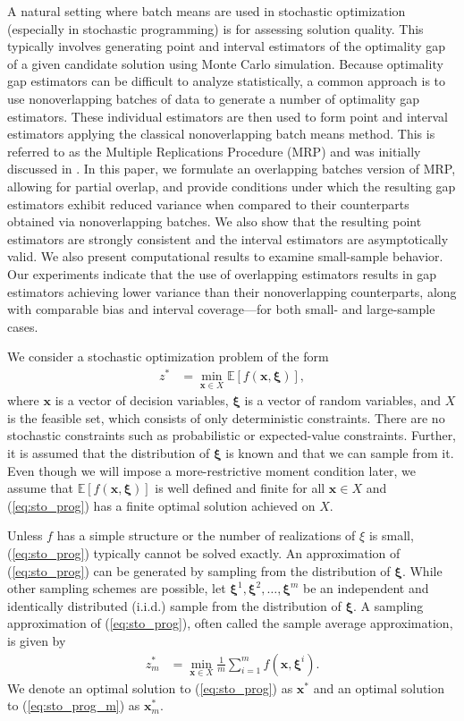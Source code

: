 \documentclass[12pt]{article}
\newcommand{\e}[1]{\mathbb{E} \left[ #1 \right]
}
\newcommand{\x}{\mathbf{x}}
\newcommand{\xs}{\x^*}
\newcommand{\xit}{\boldsymbol{\xi}}
\newcommand{\xiti}{\xit^i}
\begin{document}
A natural setting where batch means are used in stochastic optimization (especially in stochastic programming) is for assessing solution quality. 
This typically involves generating point and interval estimators of the optimality gap of a given candidate solution using Monte Carlo simulation. 
Because optimality gap estimators can be difficult to analyze statistically, a common approach is to use nonoverlapping batches of data to generate a number of optimality gap estimators. 
These individual estimators are then used to form point and interval estimators applying the classical nonoverlapping batch means method.
This is referred to as the Multiple Replications Procedure (MRP) and was initially discussed in \citep{Mak1999}.   
In this paper, we formulate an overlapping batches version of MRP, allowing for partial overlap, and provide conditions under which the resulting gap estimators exhibit reduced variance when compared to their counterparts obtained via nonoverlapping batches.
We also show that the resulting point estimators are strongly consistent and the interval estimators are asymptotically valid. 
We also present computational results to examine small-sample behavior. 
Our experiments indicate that the use of overlapping estimators results in gap estimators achieving lower variance than their nonoverlapping counterparts, along with comparable bias and interval coverage---for both small- and large-sample cases.


We consider a stochastic optimization problem of the form 
\begin{align} \tag{SP} \label{eq:sto_prog} 
	z^* & = \min_{\x \in X} \e{f(\x,\xit)},
\end{align}
where $\x$ is a vector of decision variables, $\xit$ is a vector of random variables, and $X$ is the feasible set, which consists of only deterministic constraints. 
There are no stochastic constraints such as probabilistic or expected-value constraints. 
Further, it is assumed that the distribution of $\xit$ is known and that we can sample from it.
Even though we will impose a more-restrictive moment condition later, we assume that $\e{f(\x,\xit)}$ is well defined and finite for all $\x \in X$ and (\ref{eq:sto_prog}) has a finite optimal solution achieved on $X$.


Unless $f$ has a simple structure or the number of realizations of $\xi$ is small, (\ref{eq:sto_prog}) typically cannot be solved exactly. 
An approximation of (\ref{eq:sto_prog}) can be generated by sampling from the distribution of $\xit$.
While other sampling schemes are possible, let $\xit^1, \xit^2, \dots, \xit^m$ be an independent and identically distributed (i.i.d.) sample from the distribution of $\xit$.
A sampling approximation of (\ref{eq:sto_prog}), often called the sample average approximation, is given by
\begin{align} \tag{SP$_m$} \label{eq:sto_prog_m}
	z_m^* & = \min_{\x \in X} \frac{1}{m} \sum_{i=1}^m f(\x,\xiti).
\end{align}
We denote an optimal solution to (\ref{eq:sto_prog}) as $\xs$ and an optimal solution to (\ref{eq:sto_prog_m}) as $\xs_m$.
\end{document}
